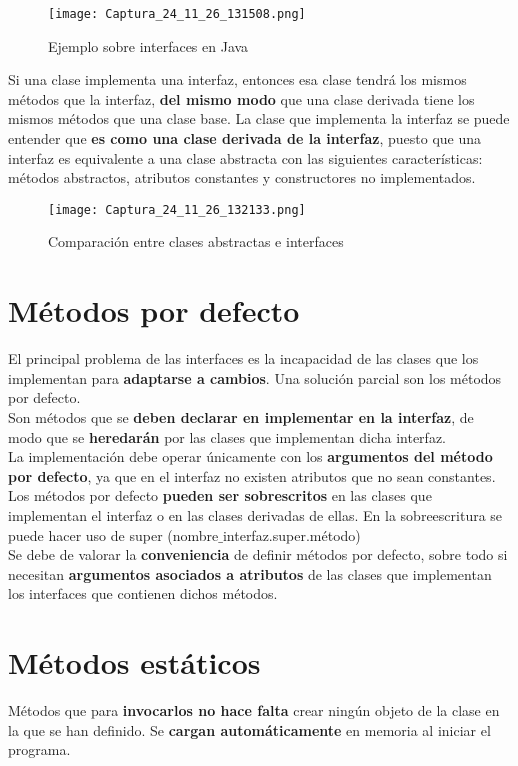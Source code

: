 \documentclass{article}
\begin{document}
\begin{figure}[h]
    \centering
    \texttt{[image: Captura\_24\_11\_26\_131508.png]}
    \caption{Ejemplo sobre interfaces en Java}
\end{figure}

Si una clase implementa una interfaz, entonces esa clase tendrá los mismos métodos que la interfaz, \textbf{del mismo modo} que una clase derivada tiene los mismos métodos que una clase base. La clase que implementa la interfaz se puede entender que \textbf{es como una clase derivada de la interfaz}, puesto que una interfaz es equivalente a una clase abstracta con las siguientes características: métodos abstractos, atributos constantes y constructores no implementados. 

\begin{figure}[h]
    \centering
    \texttt{[image: Captura\_24\_11\_26\_132133.png]}
    \caption{Comparación entre clases abstractas e interfaces}
\end{figure}

\newpage

\section{Métodos por defecto}
El principal problema de las interfaces es la incapacidad de las clases que los implementan para \textbf{adaptarse a cambios}. Una solución parcial son los métodos por defecto. \\

Son métodos que se \textbf{deben declarar en implementar en la interfaz}, de modo que se \textbf{heredarán} por las clases que implementan dicha interfaz. \\

La implementación debe operar únicamente con los \textbf{argumentos del método por defecto}, ya que en el interfaz no existen atributos que no sean constantes. Los métodos por defecto \textbf{pueden ser sobrescritos} en las clases que implementan el interfaz o en las clases derivadas de ellas. En la sobreescritura se puede hacer uso de super (nombre$\_$interfaz.super.método) \\

Se debe de valorar la \textbf{conveniencia} de definir métodos por defecto, sobre todo si necesitan \textbf{argumentos asociados a atributos} de las clases que implementan los interfaces que contienen dichos métodos.

\section{Métodos estáticos}
Métodos que para \textbf{invocarlos no hace falta} crear ningún objeto de la clase en la que se han definido. Se \textbf{cargan automáticamente} en memoria al iniciar el programa. \\
\end{document}

